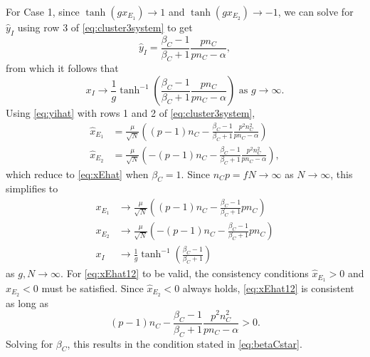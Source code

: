 \documentclass[reqno]{siamonline190516}
\begin{document}
\noindent For Case 1, since $\tanh(g x_{E_1}) \rightarrow 1$ and $\tanh(g x_{E_2}) \rightarrow -1$, we can solve for $\hat{y}_I$ using row 3 of \cref{eq:cluster3system} to get
\begin{equation}\label{eq:yihat}
    \hat{y}_I = \frac{\beta_C - 1}{\beta_C+1} \frac{p n_C}{p n_C - \alpha},
\end{equation} 
from which it follows that
\begin{equation}\label{eq:xilimiteq}
    x_I \rightarrow \frac{1}{g}\tanh^{-1}\left( \frac{\beta_C - 1}{\beta_C+1} \frac{p n_C}{p n_C - \alpha} \right) \text{ as } g \rightarrow \infty.
\end{equation}
Using \cref{eq:yihat} with rows 1 and 2 of \cref{eq:cluster3system},
\begin{equation}\label{eq:xEhat12}
\begin{aligned}
    \hat{x}_{E_1} &= \frac{\mu}{\sqrt{N}}\left( (p-1)n_C - \frac{\beta_C - 1}{\beta_C+1} \frac{p^2 n_C^2}{p n_C - \alpha} \right) \\
    \hat{x}_{E_2} &= \frac{\mu}{\sqrt{N}}\left( -(p-1)n_C - \frac{\beta_C - 1}{\beta_C+1} \frac{p^2 n_C^2}{p n_C - \alpha} \right),
\end{aligned}
\end{equation}
which reduce to \cref{eq:xEhat} when $\beta_C = 1$. Since $n_C p = f N \rightarrow \infty$ as $N \rightarrow \infty$, this simplifies to
\begin{equation}\label{eq:xEhat12IlargeN}
    \begin{aligned}
        x_{E_1} &\rightarrow\frac{\mu}{\sqrt{N}}\left( (p-1)n_C - \frac{\beta_C - 1}{\beta_C+1} p n_C \right) \\
        x_{E_2} &\rightarrow \frac{\mu}{\sqrt{N}}\left( -(p-1)n_C - \frac{\beta_C - 1}{\beta_C+1} p n_C \right) \\
        x_I &\rightarrow \frac{1}{g}\tanh^{-1}\left( \frac{\beta_C - 1}{\beta_C+1} \right)
    \end{aligned}
\end{equation}
as $g, N \rightarrow \infty$. For \cref{eq:xEhat12} to be valid, the consistency conditions $\hat{x}_{E_1} > 0$ and $\hat{x}_{E_2} < 0$ must be satisfied. Since $\hat{x}_{E_2} < 0$ always holds, \cref{eq:xEhat12} is consistent as long as
\begin{equation}\label{eq:betaCineq}
(p-1)n_C - \frac{\beta_C - 1}{\beta_C+1}\frac{p^2 n_C^2}{p n_C - \alpha}  > 0.
\end{equation}
Solving for $\beta_C$, this results in the condition stated in \ref{eq:betaCstar}.
\end{document}
